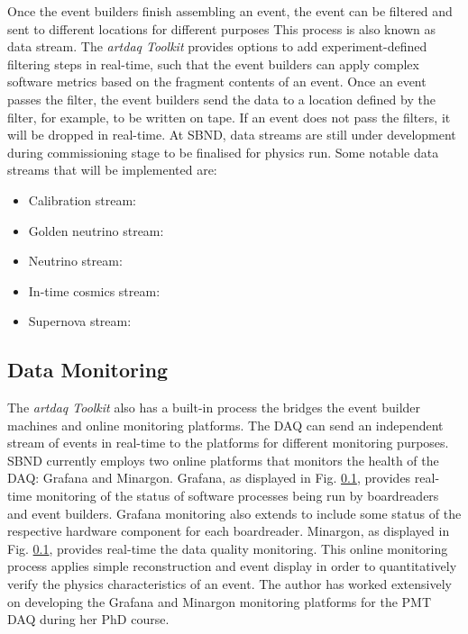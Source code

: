 Once the event builders finish assembling an event, the event can be filtered and sent to different locations for different purposes
This process is also known as data stream. 
The \textit{artdaq Toolkit} provides options to add experiment-defined filtering steps in real-time, such that the event builders can apply complex software metrics based on the fragment contents of an event.
Once an event passes the filter, the event builders send the data to a location defined by the filter, for example, to be written on tape.
If an event does not pass the filters, it will be dropped in real-time.
At SBND, data streams are still under development during commissioning stage to be finalised for physics run.
Some notable data streams that will be implemented are:
\begin{itemize}
	\item Calibration stream: 
	\item Golden neutrino stream: 
	\item Neutrino stream:
	\item In-time cosmics stream:
	\item Supernova stream:
\end{itemize}

\subsection{Data Monitoring}
The \textit{artdaq Toolkit} also has a built-in process the bridges the event builder machines and online monitoring platforms.
The DAQ can send an independent stream of events in real-time to the platforms for different monitoring purposes.
SBND currently employs two online platforms that monitors the health of the DAQ: Grafana and Minargon.
Grafana, as displayed in Fig. \ref{}, provides real-time monitoring of the status of software processes being run by boardreaders and event builders. 
Grafana monitoring also extends to include some status of the respective hardware component for each boardreader.
Minargon, as displayed in Fig. \ref{}, provides real-time the data quality monitoring. 
This online monitoring process applies simple reconstruction and event display in order to quantitatively verify the physics characteristics of an event. 
The author has worked extensively on developing the Grafana and Minargon monitoring platforms for the PMT DAQ during her PhD course. 

